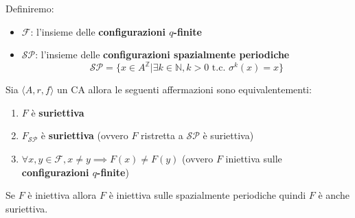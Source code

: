 \begin{definizione}
    Definiremo:
    \begin{itemize}
        \item $\mathcal{F}$: l'insieme delle \textbf{configurazioni $q$-finite}
        \item $\mathcal{SP}$: l'insieme delle \textbf{configurazioni spazialmente periodiche}
        \begin{equation*}
            \mathcal{SP}= \{x\in A^\mathbb{Z} | \exists k \in \mathbb{N}, k>0 \text{ t.c. }\sigma^k(x)=x\}    
        \end{equation*}
    \end{itemize}
\end{definizione}

\begin{teorema}
    Sia $\langle A,r,f\rangle$ un CA allora le seguenti affermazioni sono equivalentementi:
    \begin{enumerate}
        \item $F$ è \textbf{suriettiva}
        \item $F_{\mathcal{SP}}$ è \textbf{suriettiva} (ovvero $F$ ristretta a $\mathcal{SP}$ è suriettiva)
        \item $\forall x,y \in \mathcal{F}, x\ne y \implies F(x)\ne F(y)$ (ovvero $F$ iniettiva sulle \textbf{configurazioni $q$-finite})
    \end{enumerate}
\end{teorema}

\begin{teorema}
    Se $F$ è iniettiva allora $F$ è iniettiva sulle spazialmente periodiche quindi
    $F$ è anche suriettiva.
\end{teorema}

